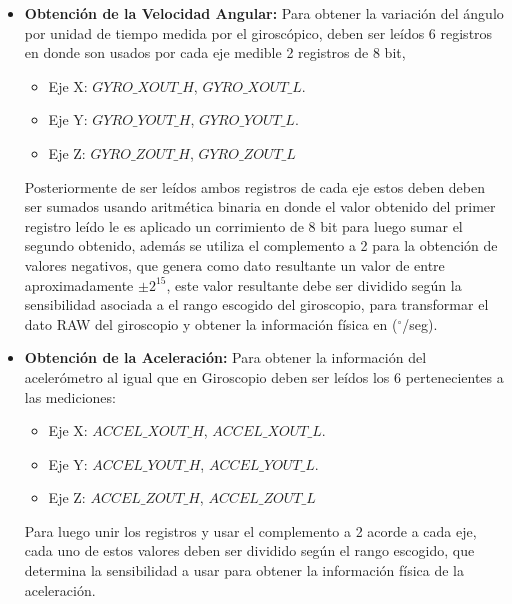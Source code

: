\documentclass[12pt,a4paper]{article}
\newcommand{\grad}{$^{\circ}$}
\begin{document}
\begin{itemize}
\item \textbf{Obtención de la Velocidad Angular:} Para obtener la variación del ángulo por unidad de tiempo medida por el giroscópico, deben ser leídos 6 registros en donde son usados por cada eje medible 2 registros de 8 bit,
\begin{itemize}
	\item Eje X: $GYRO\_XOUT\_H$, $GYRO\_XOUT\_L$.
	\item Eje Y: $GYRO\_YOUT\_H$, $GYRO\_YOUT\_L$.
	\item Eje Z: $GYRO\_ZOUT\_H$, $GYRO\_ZOUT\_L$
\end{itemize}
Posteriormente de ser leídos ambos registros de cada eje estos deben deben ser sumados usando aritmética binaria en donde el valor obtenido del primer registro leído le es aplicado un corrimiento de 8 bit para luego sumar el segundo obtenido, además se utiliza el complemento a 2 para la obtención de valores negativos, que genera como dato resultante un valor de entre aproximadamente $\pm 2^{15}$, este valor resultante debe ser dividido según la sensibilidad asociada a el rango escogido del giroscopio, para transformar el dato RAW del giroscopio y obtener la información física en (\grad/seg).

\item \textbf{Obtención de la Aceleración:} Para obtener la información del acelerómetro al igual que en Giroscopio deben ser leídos los 6 pertenecientes a las mediciones:
\begin{itemize}
	\item Eje X: $ACCEL\_XOUT\_H$, $ACCEL\_XOUT\_L$.
	\item Eje Y: $ACCEL\_YOUT\_H$, $ACCEL\_YOUT\_L$.
	\item Eje Z: $ACCEL\_ZOUT\_H$, $ACCEL\_ZOUT\_L$
\end{itemize}

Para luego unir los registros y usar el complemento a 2 acorde a cada eje, cada uno de estos valores deben ser dividido según el rango escogido, que determina la sensibilidad a usar para obtener la información física de la aceleración.

\end{itemize}
\end{document}
